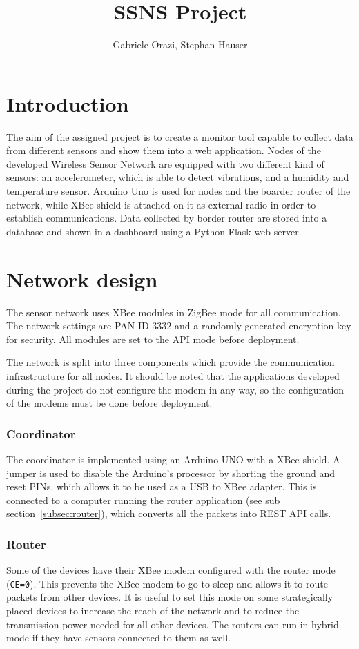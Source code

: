 \documentclass[a4paper,11pt]{scrartcl}
\title{SSNS Project}
\author{Gabriele Orazi, Stephan Hauser}
\begin{document}
\maketitle

\part{Introduction}
The aim of the assigned project is to create a monitor tool capable to collect data from different sensors and show them into a web application.
Nodes of the developed Wireless Sensor Network are equipped with two different kind of sensors: an accelerometer, which is able to detect vibrations, and a humidity and temperature sensor.
Arduino Uno is used for nodes and the boarder router of the network, while XBee shield is attached on it as external radio in order to establish communications.
Data collected by border router are stored into a database and shown in a dashboard using a Python Flask web server.

\part{Network design}
The sensor network uses XBee modules in ZigBee mode for all communication. The network settings are PAN ID 3332 and a randomly generated encryption key for security. All modules are set to the API mode before deployment.

The network is split into three components which provide the communication infrastructure for all nodes. It should be noted that the applications developed during the project do not configure the modem in any way, so the configuration of the modems must be done before deployment.

\section{Coordinator}\label{sec:coordinator}
The coordinator is implemented using an Arduino UNO with a XBee shield. A jumper is used to disable the Arduino's processor by shorting the ground and reset PINs, which allows it to be used as a USB to XBee adapter. This is connected to a computer running the router application (see sub section~\ref{subsec:router}), which converts all the packets into REST API calls.

\section{Router}
Some of the devices have their XBee modem configured with the router mode (\texttt{CE=0}). This prevents the XBee modem to go to sleep and allows it to route packets from other devices. It is useful to set this mode on some strategically placed devices to increase the reach of the network and to reduce the transmission power needed for all other devices. The routers can run in hybrid mode if they have sensors connected to them as well.
\end{document}
